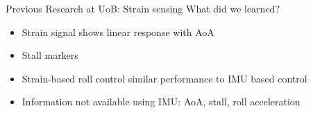 \documentclass[aspectratio=169]{beamer}            %
\begin{document}
%
%

\begin{frame}{Previous Research at UoB: Strain sensing}
  What did we learned?
	\pause
    \begin{itemize}[<+->]
      \item Strain signal shows linear response with AoA
      \item Stall markers
      \item Strain-based roll control similar performance to IMU based control
			\item Information not available using IMU: AoA, stall, roll acceleration
    \end{itemize}
\end{frame}
\end{document}
